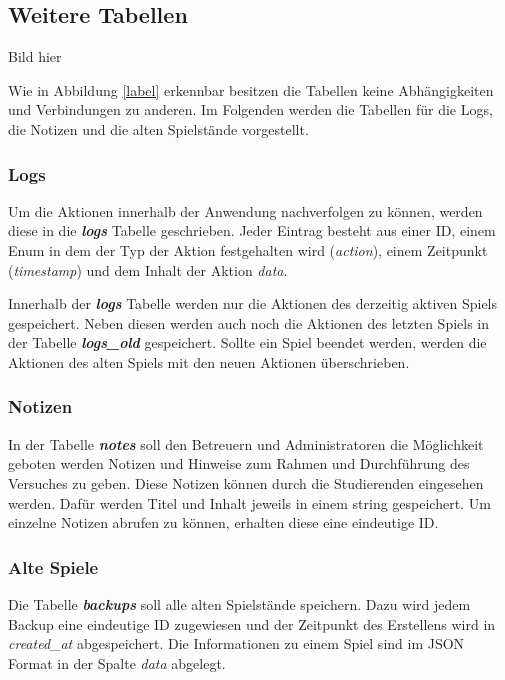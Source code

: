 \subsection{Weitere Tabellen}
Bild hier

Wie in Abbildung \ref{label} erkennbar besitzen die Tabellen keine Abhängigkeiten und Verbindungen zu anderen. Im Folgenden werden die Tabellen für die Logs, die Notizen und die alten Spielstände vorgestellt.

\subsubsection{Logs}
Um die Aktionen innerhalb der Anwendung nachverfolgen zu können, werden diese in die \textbf{\textit{logs}} Tabelle geschrieben. Jeder Eintrag besteht aus einer ID, einem Enum in dem der Typ der Aktion festgehalten wird (\textit{action}), einem Zeitpunkt (\textit{timestamp}) und dem Inhalt der Aktion \textit{data}. 

Innerhalb der \textbf{\textit{logs}} Tabelle werden nur die Aktionen des derzeitig aktiven Spiels gespeichert. Neben diesen werden auch noch die Aktionen des letzten Spiels in der Tabelle \textbf{\textit{logs\_old}} gespeichert. Sollte ein Spiel beendet werden, werden die Aktionen des alten Spiels mit den neuen Aktionen überschrieben.

\subsubsection{Notizen}
In der Tabelle \textbf{\textit{notes}} soll den Betreuern und Administratoren die Möglichkeit geboten werden Notizen und Hinweise zum Rahmen und Durchführung des Versuches zu geben. Diese Notizen können durch die Studierenden eingesehen werden. Dafür werden Titel und Inhalt jeweils in einem string gespeichert. Um einzelne Notizen abrufen zu können, erhalten diese eine eindeutige ID.

\subsubsection{Alte Spiele}
Die Tabelle \textbf{\textit{backups}} soll alle alten Spielstände speichern. Dazu wird jedem Backup eine eindeutige ID zugewiesen und der Zeitpunkt des Erstellens wird in \textit{created\_at} abgespeichert. Die Informationen zu einem Spiel sind im JSON Format in der Spalte \textit{data} abgelegt.